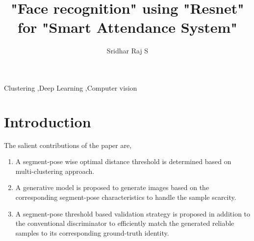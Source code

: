 \documentclass[preprint,12pt]{elsarticle}
\begin{document}
	

\begin{frontmatter}

\title{"Face recognition" using "Resnet" for "Smart Attendance System"}
\author[1]{Sridhar Raj S}
\author[2]{}
\ead{}
\author[3]{}
\ead{}
\address[1]{Indian Institute of Information Technology, Kottayam, India}
\address[2]{}
\address[3]{}

\begin{abstract}
\end{abstract}

\begin{keyword}
 Clustering \sep Deep Learning \sep Computer vision
\end{keyword}

\end{frontmatter}

\linenumbers
\section{Introduction} 


The salient contributions of the paper are,
\begin{enumerate}
    \item A segment-pose wise optimal distance threshold is determined based on multi-clustering approach. 
    \item A generative model is proposed to generate images based on the corresponding segment-pose characteristics to handle the sample scarcity.
    \item A segment-pose threshold based validation strategy is proposed in addition to the conventional discriminator to efficiently match the generated reliable samples to its corresponding ground-truth identity.
\end{enumerate}
\end{document}
